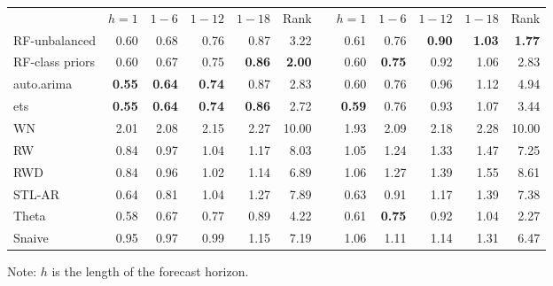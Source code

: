 \documentclass[11pt,a4paper,]{article}
\begin{document}
\begin{table}[!htbp]
\begin{tabular}{lrrrrrrrrrrr}
                     &    $h=1$ &    $1-6$   &     $1-12$ &    $1-18$  &   Rank     &            &   $h=1$  &    $1-6$   &    $1-12$  &    $1-18$  &   Rank \\\cmidrule(lr){2-6} \cmidrule(lr){8-12}
RF-unbalanced        &       0.60 &       0.68 &       0.76 &       0.87 &       3.22 &            &       0.61 &       0.76 & {\bf 0.90} & {\bf 1.03} &       {\bf 1.77} \\
RF-class priors      &       0.60 &       0.67 & 0.75 & {\bf 0.86} &       {\bf 2.00} &            &       0.60 &       {\bf 0.75} &       0.92 &       1.06 &        2.83 \\
auto.arima           &      {\bf 0.55 }&      {\bf 0.64} &      {\bf 0.74} &       0.87 &       2.83 &            &       0.60 &       0.76 &       0.96 &       1.12 &       4.94 \\
ets                  & {\bf 0.55} & {\bf 0.64} & {\bf 0.74} &       {\bf 0.86} & 2.72 &            &      {\bf 0.59} &       0.76 &       0.93 &       1.07 &       3.44 \\
WN                   &       2.01 &       2.08 &       2.15 &       2.27 &      10.00 &            &       1.93 &       2.09 &       2.18 &       2.28 &      10.00 \\
RW                   &       0.84 &       0.97 &       1.04 &       1.17 &    8.03 &            &       1.05 &       1.24 &       1.33 &       1.47 &      7.25 \\
RWD                  &       0.84 &       0.96 &       1.02 &       1.14 &       6.89 &            &       1.06 &       1.27 &       1.39 &       1.55 &      8.61 \\
STL-AR               &       0.64 &       0.81 &       1.04 &       1.27 &       7.89 &            &       0.63 &       0.91 &       1.17 &       1.39 &       7.38 \\
Theta                &       0.58 &       0.67 &       0.77 &       0.89 &       4.22 &            & 0.61 & {\bf 0.75} &       0.92 &       1.04 & 2.27 \\
Snaive               &       0.95 &       0.97 &       0.99 &       1.15 &       7.19 &            &       1.06 &       1.11 &       1.14 &       1.31 &       6.47 \\
\bottomrule
\end{tabular}
{\raggedright Note: $h$ is the length of the forecast horizon. \par}
\end{table}
\end{document}
